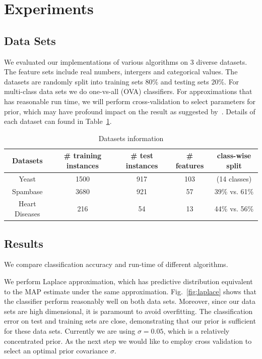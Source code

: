 \section{Experiments}
\label{sec:experiments}

\subsection{Data Sets}

We evaluated our implementations of various algorithms on 3 diverse datasets. The feature sets include real numbers, intergers and categorical values. The datasets are randomly split into training sets $80\%$ and
testing sets $20\%$. For multi-class data sets we do one-vs-all (OVA)
classifiers. For approximations that has reasonable run time, we will perform
cross-validation to select parameters for prior, which may have profound
impact on the result as suggested by~\cite{Asuncion2009smoothing}. Details of each dataset can found in Table~\ref{tb:datasets}.

\begin{table}
\begin{tabular}{| c | c |  c | c | c |}
  \hline
  Datasets & \# training instances & \# test instances & \# features & class-wise split\\
  \hline
  Yeast & 1500 & 917 & 103 & (14 classes) \\
  \hline
  Spambase & 3680 & 921 & 57 & 39\% vs. 61\% \\
  \hline
  Heart Diseases & 216 & 54 & 13 & 44\% vs. 56\% \\
  \hline
\end{tabular}

\caption{Datasets information}
\label{tb:datasets}
\end{table}

\subsection{Results}

We compare classification accuracy and run-time of different algorithms.

We perform Laplace approximation, which has predictive distribution equivalent
to the MAP estimate under the same approximation. Fig.~\ref{fig:laplace} shows
that the classifier perform reasonably well on both data sets. Moreover, since
our data sets are high dimensional, it is paramount to avoid overfitting. The
classification error on test and training sets are close, demonstrating that
our prior is sufficient for these data sets. Currently we are using $\sigma =
0.05$, which is a relatively concentrated prior. As the next step we would
like to employ cross validation to select an optimal prior covariance $\sigma$.


